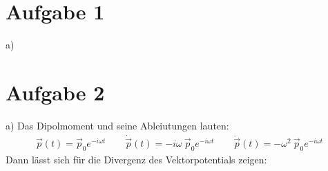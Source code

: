 \documentclass[11pt a4paper]{article}
\begin{document}
\thispagestyle{fancy}

\section*{Aufgabe 1}
a) 

\newpage
\setlength{\headheight}{0cm}
\section*{Aufgabe 2}
a) Das Dipolmoment und seine Ableiutungen lauten:
\begin{align*}
	\vec p(t) 
	= \vec p_0 e^{-i\omega t}
	\qquad
	\dot{\vec p}(t) 
	= -i\omega \ \vec p_0 e^{-i\omega t}
	\qquad
	\ddot{\vec p}(t) 
	= -\omega^2 \ \vec p_0 e^{-i\omega t}
\end{align*}
Dann lässt sich für die Divergenz des Vektorpotentials zeigen:
\end{document}
